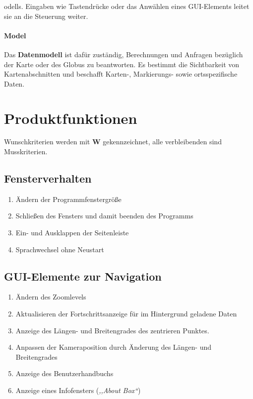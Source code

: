 \documentclass[10pt]{scrreprt}
\newcommand{\sfbf}[1]{\textbf{\sffamily #1}}
\newcommand{\W}{\sfbf{W}}
\newcommand{\ziel}[1]{{\fontsize{9.5}{11}\textsf{/#1/}}}
\newcommand{\ziellabel}{Z}
\newcommand{\muss}{\renewcommand{\labelenumi}{\textbf{\ziel{\ziellabel\numprint{\theenumi}0}}}}
\begin{document}
odells. Eingaben wie Tastendrücke oder das Anwählen eines GUI-Elements leitet sie an die Steuerung weiter.

\subsubsection*{Model}
Das \textbf{Datenmodell} ist dafür zuständig, Berechnungen und Anfragen bezüglich der Karte oder des Globus zu beantworten. Es bestimmt die Sichtbarkeit von Kartenabschnitten und beschafft Karten-, Markierungs- sowie ortsspezifische Daten.


\chapter{Produktfunktionen}

\muss
\renewcommand{\ziellabel}{F}

Wunschkriterien werden mit {\W } gekennzeichnet, alle verbleibenden sind Musskriterien.

\section{Fensterverhalten}
\begin{enumerate}[leftmargin=2.2cm]
\item Ändern der Programmfenstergröße 
\item Schließen des Fensters und damit beenden des Programms
\item Ein- und Ausklappen der Seitenleiste
\item Sprachwechsel ohne Neustart
\end{enumerate}

\section{GUI-Elemente zur Navigation}
\begin{enumerate}[leftmargin=2.2cm,resume]
\item Ändern des Zoomlevels
\item Aktualisieren der Fortschrittsanzeige für im Hintergrund geladene Daten
\item Anzeige des Längen- und Breitengrades des zentrieren Punktes.
\item Anpassen der Kameraposition durch Änderung des Längen- und Breitengrades
\item Anzeige des Benutzerhandbuchs
\item Anzeige eines Infofensters (\textit{,,About Box``})
\end{enumerate}
\end{document}
